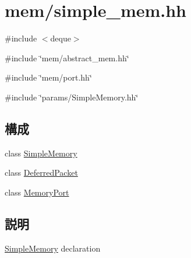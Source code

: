\hypertarget{simple__mem_8hh}{
\section{mem/simple\_\-mem.hh}
\label{simple__mem_8hh}
}
{\ttfamily \#include $<$deque$>$}\par
{\ttfamily \#include \char`\"{}mem/abstract\_\-mem.hh\char`\"{}}\par
{\ttfamily \#include \char`\"{}mem/port.hh\char`\"{}}\par
{\ttfamily \#include \char`\"{}params/SimpleMemory.hh\char`\"{}}\par
\subsection*{構成}
\begin{DoxyCompactItemize}
\item 
class \hyperlink{classSimpleMemory}{SimpleMemory}
\item 
class \hyperlink{classSimpleMemory_1_1DeferredPacket}{DeferredPacket}
\item 
class \hyperlink{classSimpleMemory_1_1MemoryPort}{MemoryPort}
\end{DoxyCompactItemize}


\subsection{説明}
\hyperlink{classSimpleMemory}{SimpleMemory} declaration 